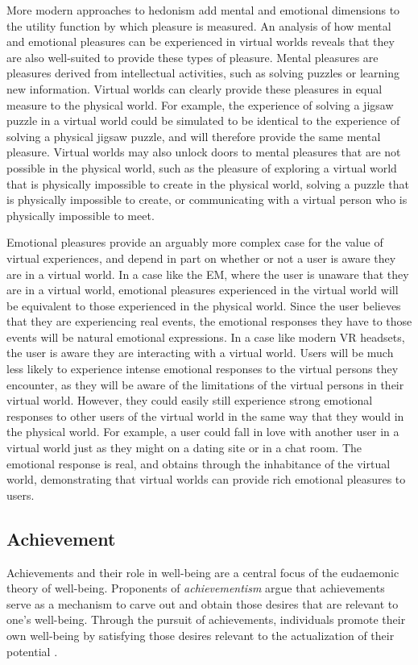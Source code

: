 More modern approaches to hedonism add mental and emotional dimensions to the 
utility function by which pleasure is measured. An analysis of how mental and 
emotional pleasures can be experienced in virtual worlds reveals that they are
also well-suited to provide these types of pleasure. Mental pleasures are 
pleasures derived from intellectual activities, such as solving puzzles or
learning new information. Virtual worlds can clearly provide these pleasures in
equal measure to the physical world. For example, the experience of solving a 
jigsaw puzzle in a virtual world could be simulated to be identical to the
experience of solving a physical jigsaw puzzle, and will therefore provide the
same mental pleasure. Virtual worlds may also unlock doors to mental pleasures
that are not possible in the physical world, such as the pleasure of exploring
a virtual world that is physically impossible to create in the physical world,
solving a puzzle that is physically impossible to create, or communicating 
with a virtual person who is physically impossible to meet.

Emotional pleasures provide an arguably more complex case for the value of
virtual experiences, and depend in part on whether or not a user is aware they
are in a virtual world. In a case like the EM, where the user is unaware that
they are in a virtual world, emotional pleasures experienced in the virtual
world will be equivalent to those experienced in the physical world. Since the
user believes that they are experiencing real events, the emotional responses
they have to those events will be natural emotional expressions. In a case like
modern VR headsets, the user is aware they are interacting with a virtual world.
Users will be much less likely to experience intense emotional responses to the
virtual persons they encounter, as they will be aware of the limitations of the
virtual persons in their virtual world. However, they could easily still
experience strong emotional responses to other users of the virtual world in
the same way that they would in the physical world. For example, a user could
fall in love with another user in a virtual world just as they might on a dating
site or in a chat room. The emotional response is real, and obtains through the
inhabitance of the virtual world, demonstrating that virtual worlds can provide
rich emotional pleasures to users.

\subsection{Achievement}
Achievements and their role in well-being are a central focus of the eudaemonic
theory of well-being. Proponents of \emph{achievementism} argue that
achievements serve as a mechanism to carve out and obtain those desires that are
relevant to one's well-being. Through the pursuit of achievements, individuals
promote their own well-being by satisfying those desires relevant to the
actualization of their potential \citep{Bradford2016-BRAAWA-3}.

